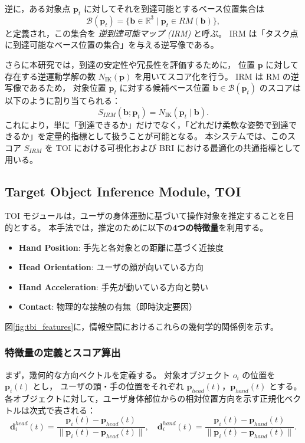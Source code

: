 \documentclass[../../main.tex]{subfiles} %
\begin{document}
逆に，ある対象点 $\mathbf{p}_t$ に対してそれを到達可能とするベース位置集合は
\begin{equation}
\mathcal{B}(\mathbf{p}_t) = \{ \mathbf{b} \in \mathbb{R}^3 \mid \mathbf{p}_t \in RM(\mathbf{b}) \},
\end{equation}
と定義され，この集合を \textit{逆到達可能マップ (IRM)} と呼ぶ。
IRM は「タスク点に到達可能なベース位置の集合」を与える逆写像である。

さらに本研究では，到達の安定性や冗長性を評価するために，
位置 $\mathbf{p}$ に対して存在する逆運動学解の数 $N_{\text{IK}}(\mathbf{p})$ を用いてスコア化を行う。
IRM は RM の逆写像であるため，
対象位置 $\mathbf{p}_t$ に対する候補ベース位置 $\mathbf{b} \in \mathcal{B}(\mathbf{p}_t)$ のスコアは以下のように割り当てられる：
\begin{equation}
S_{IRM}(\mathbf{b}; \mathbf{p}_t) = N_{\text{IK}}(\mathbf{p}_t \mid \mathbf{b}).
\end{equation}
これにより，単に「到達できるか」だけでなく，「どれだけ柔軟な姿勢で到達できるか」を定量的指標として扱うことが可能となる。
本システムでは、このスコア $S_{IRM}$ を TOI における可視化および BRI における最適化の共通指標として用いる。


\subsection{Target Object Inference Module, TOI}

TOI モジュールは，ユーザの身体運動に基づいて操作対象を推定することを目的とする。
本手法では，推定のために以下の\textbf{4つの特徴量}を利用する。
\begin{itemize}
  \item \textbf{Hand Position}: 手先と各対象との距離に基づく近接度
  \item \textbf{Head Orientation}: ユーザの顔が向いている方向
  \item \textbf{Hand Acceleration}: 手先が動いている方向と勢い
  \item \textbf{Contact}: 物理的な接触の有無（即時決定要因）
\end{itemize}

図\ref{fig:tbi_features}に，情報空間におけるこれらの幾何学的関係例を示す。

\subsubsection{特徴量の定義とスコア算出}
まず，幾何的な方向ベクトルを定義する。
対象オブジェクト $o_i$ の位置を $\mathbf{p}_i(t)$ とし，
ユーザの頭・手の位置をそれぞれ $\mathbf{p}_{head}(t)$，$\mathbf{p}_{hand}(t)$ とする。
各オブジェクトに対して，ユーザ身体部位からの相対位置方向を示す正規化ベクトルは次式で表される：
\begin{equation}
\mathbf{d}_i^{head}(t) = \frac{\mathbf{p}_i(t)-\mathbf{p}_{head}(t)}{\|\mathbf{p}_i(t)-\mathbf{p}_{head}(t)\|}, \quad
\mathbf{d}_i^{hand}(t) = \frac{\mathbf{p}_i(t)-\mathbf{p}_{hand}(t)}{\|\mathbf{p}_i(t)-\mathbf{p}_{hand}(t)\|}.
\end{equation}
\end{document}
